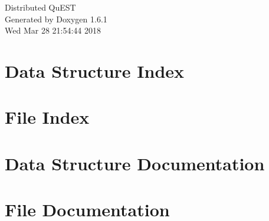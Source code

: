 \documentclass[a4paper]{article}
\begin{document}
\hypersetup{pageanchor=false}
\begin{titlepage}
\vspace*{7cm}
\begin{center}
{\Large Distributed QuEST }\\
\vspace*{1cm}
{\large Generated by Doxygen 1.6.1}\\
\vspace*{0.5cm}
{\small Wed Mar 28 21:54:44 2018}\\
\end{center}
\end{titlepage}
\tableofcontents
{}
\hypersetup{pageanchor=true}
\section{Data Structure Index}

\section{File Index}

\section{Data Structure Documentation}






\section{File Documentation}












\printindex
\end{document}
